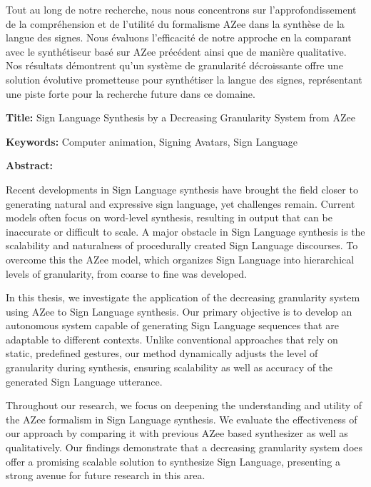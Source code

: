 \documentclass[english,12pt,a4paper]{book}
\begin{document}
\begin{mdframed}[linecolor=Prune,linewidth=1]
\begin{multicols}{2}
Tout au long de notre recherche, nous nous concentrons sur l'approfondissement de la compréhension et de l'utilité du formalisme AZee dans la synthèse de la langue des signes. Nous évaluons l'efficacité de notre approche en la comparant avec le synthétiseur basé sur AZee précédent ainsi que de manière qualitative. Nos résultats démontrent qu'un système de granularité décroissante offre une solution évolutive prometteuse pour synthétiser la langue des signes, représentant une piste forte pour la recherche future dans ce domaine.

\end{multicols}

\end{mdframed}

\newpage

\vspace{8mm}

\begin{mdframed}[linecolor=Prune,linewidth=1]

\textbf{Title:} Sign Language Synthesis by a Decreasing Granularity System from AZee

\noindent \textbf{Keywords:} Computer animation, Signing Avatars, Sign Language

\begin{multicols}{2}
\noindent \textbf{Abstract:}

Recent developments in Sign Language synthesis have brought the field closer to generating natural and expressive sign language, yet challenges remain. Current models often focus on word-level synthesis, resulting in output that can be inaccurate or difficult to scale. A major obstacle in Sign Language synthesis is the scalability and naturalness of procedurally created Sign Language discourses. To overcome this the AZee model, which organizes Sign Language into hierarchical levels of granularity, from coarse to fine was developed.

In this thesis, we investigate the application of the decreasing granularity system using AZee to Sign Language synthesis. Our primary objective is to develop an autonomous system capable of generating Sign Language sequences that are adaptable to different contexts. Unlike conventional approaches that rely on static, predefined gestures, our method dynamically adjusts the level of granularity during synthesis, ensuring scalability as well as accuracy of the generated Sign Language utterance.

Throughout our research, we focus on deepening the understanding and utility of the AZee formalism in Sign Language synthesis. We evaluate the effectiveness of our approach by comparing it with previous AZee based synthesizer as well as qualitatively. Our findings demonstrate that a decreasing granularity system does offer a promising scalable solution to synthesize Sign Language, presenting a strong avenue for future research in this area.

\end{multicols}
\end{mdframed}
\end{document}
